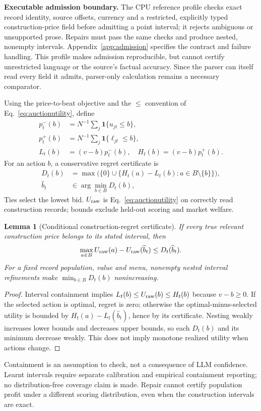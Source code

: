 \documentclass[sigconf,anonymous,nonacm]{acmart}
\newtheorem{repairlemma}{Lemma}
\begin{document}
\textbf{Executable admission boundary.} The CPU reference profile checks exact record identity, source offsets, currency and a restricted, explicitly typed construction-price field before admitting a point interval; it rejects ambiguous or unsupported prose. Repairs must pass the same checks and produce nested, nonempty intervals. Appendix~\ref{app:admission} specifies the contract and failure handling. This profile makes admission reproducible, but cannot certify unrestricted language or the source's factual accuracy. Since the parser can itself read every field it admits, parser-only calculation remains a necessary comparator.

Using the price-to-beat objective and the $\leq$ convention of Eq.~\ref{eq:auctionutility}, define
\[
\begin{aligned}
p_t^-(b)&=N^{-1}\sum_j\mathbf1\{u_{jt}\leq b\},\\
p_t^+(b)&=N^{-1}\sum_j\mathbf1\{\ell_{jt}\leq b\},\\
L_t(b)&=(v-b)p_t^-(b),\quad
H_t(b)=(v-b)p_t^+(b).
\end{aligned}
\]
For an action $b$, a conservative regret certificate is
\[
\begin{aligned}
D_t(b)&=\max\bigl(\{0\}\cup
\{H_t(a)-L_t(b):a\in B\setminus\{b\}\}\bigr),\\
\widehat b_t&\in\arg\min_{b\in B}D_t(b),
\end{aligned}
\]
Ties select the lowest bid. $U_{\rm raw}$ is Eq.~\ref{eq:auctionutility} on correctly read construction records; bounds exclude held-out scoring and market welfare.

\begin{repairlemma}[Conditional construction-regret certificate]\label{lem:repaircertificate}
If every true relevant construction price belongs to its stated interval, then
\[
\max_{a\in B}U_{\rm raw}(a)-U_{\rm raw}(\widehat b_t)
\leq D_t(\widehat b_t).
\]
For a fixed record population, value and menu, nonempty nested interval refinements make $\min_{b\in B}D_t(b)$ nonincreasing.
\end{repairlemma}
\begin{proof}
Interval containment implies $L_t(b)\leq U_{\rm raw}(b)\leq H_t(b)$ because $v-b\geq0$. If the selected action is optimal, regret is zero; otherwise the optimal-minus-selected utility is bounded by $H_t(a)-L_t(\widehat b_t)$, hence by its certificate. Nesting weakly increases lower bounds and decreases upper bounds, so each $D_t(b)$ and its minimum decrease weakly. This does not imply monotone realized utility when actions change.
\end{proof}
Containment is an assumption to check, not a consequence of LLM confidence. Learnt intervals require separate calibration and empirical containment reporting; no distribution-free coverage claim is made. Repair cannot certify population profit under a different scoring distribution, even when the construction intervals are exact.
\end{document}
